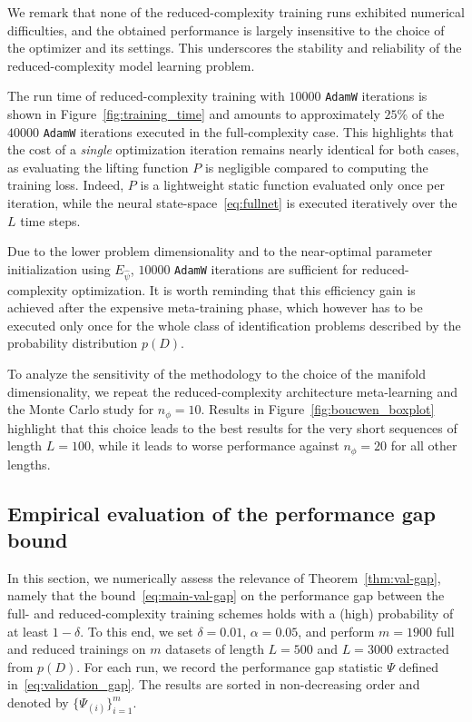\documentclass{article}
\newcommand{\redpar}{\phi}
\newcommand{\encpar}{\psi}
\begin{document}
We remark that none of the reduced-complexity training runs exhibited numerical difficulties, and the obtained performance is largely insensitive to the choice of the optimizer and its settings. This underscores the stability and reliability of the reduced-complexity model learning problem.

The run time of reduced-complexity training with $10000$ \texttt{AdamW} iterations is shown in Figure~\ref{fig:training_time} and amounts to approximately $25$\% of the $40000$ \texttt{AdamW} iterations executed in the full-complexity case. This highlights that the cost of a \emph{single} optimization iteration remains nearly identical for both cases, as evaluating the lifting function $P$ is negligible compared to computing the training loss. Indeed, $P$ is a lightweight static function evaluated only once per iteration, while the neural state-space~\eqref{eq:fullnet} is executed iteratively over the $L$ time steps.

Due to the lower problem dimensionality and to the near-optimal parameter initialization
using $E_{\hat \encpar}$, $10000$ \texttt{AdamW} iterations are sufficient for reduced-complexity optimization.
It is worth reminding  that this efficiency gain is achieved after the expensive meta-training phase, which however has to be executed only once for the whole class of identification problems described by the probability distribution $p(D)$.

To analyze the sensitivity of the methodology to the choice of the manifold dimensionality, we repeat the reduced-complexity architecture meta-learning and the Monte Carlo study for $n_\redpar=10$. Results in Figure~\ref{fig:boucwen_boxplot} highlight that this choice leads to the best results for the very short sequences of length $L=100$, while it leads to worse performance against $n_\redpar=20$ for all other lengths.

\subsection{Empirical evaluation of the performance gap bound}
In this section, we numerically assess the relevance
of  Theorem~\ref{thm:val-gap}, namely that the bound~\eqref{eq:main-val-gap} on the performance gap between the full- and reduced-complexity training schemes holds with a (high) probability of at least \(1-\delta\). To this end, we set \(\delta=0.01\), \(\alpha=0.05\), and perform $m=1900$  full and reduced trainings on
$m$ datasets of length $L=500$ and $L=3000$ extracted from $p(D)$.
For each run, we record the performance gap statistic  $\Psi$ defined in~\eqref{eq:validation_gap}. The results are sorted in non-decreasing order and denoted by \(\{\Psi_{(i)}\}_{i=1}^m\).
\end{document}
